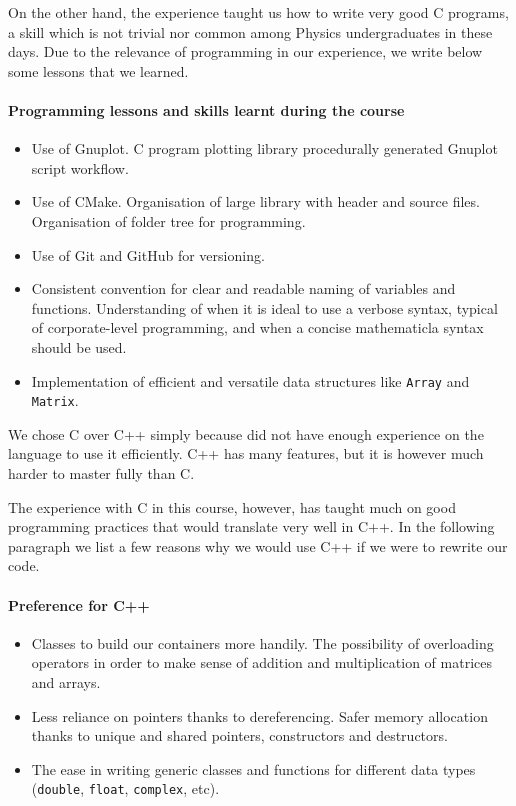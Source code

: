 \documentclass[a4paper,11]{article}
\newcommand{\mdcode}[1]{\lstinline[backgroundcolor=\color{gray!10}, frame=single, frameround=tttt]|#1|}
\begin{document}
On the other hand, the experience taught us how to write very good C programs,
a skill which is not trivial nor common among Physics
undergraduates in these days. Due to the relevance of programming in our 
experience, we write below some lessons that we learned.

\paragraph{Programming lessons and skills learnt during the course}

\begin{itemize}
	\item{
		Use of Gnuplot. C program \rightarrow plotting library
		\rightarrow procedurally generated Gnuplot script workflow.
	}
	\item{
		Use of CMake. Organisation of large library with header and source 
		files. Organisation of folder tree for programming.
	}
	\item{
		Use of Git and GitHub for versioning.
	}
	\item{
		Consistent convention for clear and readable naming of variables and
		functions. Understanding of when it is ideal to use a verbose syntax, 
		typical of corporate-level programming, and when a concise 
		mathematicla syntax should be used.
	}
	\item{
		Implementation of efficient and versatile data structures like
		\mdcode{Array} and \mdcode{Matrix}.
	}
\end{itemize}

We chose C over C++ simply because did not have enough experience on the 
language to use it efficiently. C++ has many features, but it is however much 
harder to master fully than C.

The experience with C in this course, however, has taught much on good 
programming practices that would translate very well in C++. In the following 
paragraph we list a few reasons why we would use C++ if we were to 
rewrite our code.

\paragraph{Preference for C++}

\begin{itemize}
	\item{
		Classes to build our containers more handily. The possibility of overloading
		operators in order to make sense of addition and multiplication of 
		matrices and arrays.
	}
	\item{
		Less reliance on pointers thanks to dereferencing. Safer memory allocation
		thanks to unique and shared pointers, constructors and destructors.
	}
	\item{
		The ease in writing generic classes and functions for different data 
		types (\mdcode{double}, \mdcode{float}, \mdcode{complex}, etc).
	}
\end{itemize}
\end{document}
